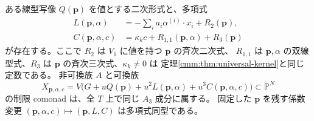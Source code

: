 \begin{proposition}[三角な多項式係数変更]
\label{lcc:prop:triangular-coefficients}
ある線型写像 $Q(\mathbf p)$ を値とする二次形式と、多項式
\begin{align*}
 L(\mathbf p,\alpha)&=-\sum_i a_i\alpha^{(i)}\cdot x_i+R_2(\mathbf p),\\
 C(\mathbf p,\alpha,c)&=\kappa_kc+R_{1,1}(\mathbf p,\alpha)+R_3(\mathbf p)
\end{align*}
が存在する。ここで $R_2$ は $V_1$ に値を持つ $\mathbf p$ の斉次二次式、
$R_{1,1}$ は $\mathbf p,\alpha$ の双線型式、$R_3$ は
$\mathbf p$ の斉次三次式、$\kappa_k\ne0$ は
定理\ref{cmm:thm:universal-kernel}と同じ定数である。
非可換族 $A$ と可換族
\begin{equation}\label{lcc:eq:triangular-target}
 X_{\mathbf p,\alpha,c}
 =V\bigl(G+uQ(\mathbf p)+u^2L(\mathbf p,\alpha)
                     +u^3C(\mathbf p,\alpha,c)\bigr)\subset\mathbb P^N
\end{equation}
の制限 comonad は、全 $T$ 上で同じ $A_3$ 成分に属する。
固定した $\mathbf p$ を残す係数変更
$(\mathbf p,\alpha,c)\mapsto(\mathbf p,L,C)$ は多項式同型である。
\end{proposition}

